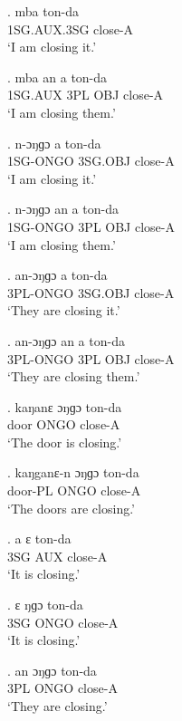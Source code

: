 \documentclass{assets/fieldnotes}
\begin{document}
\exg.
mba           ton-da  \\
1SG.AUX.3SG   close-A \\%
`I am closing it.'

\exg.
mba       an    a     ton-da  \\
1SG.AUX   3PL   OBJ   close-A \\%
`I am closing them.'

\exg.
n-ɔŋɡɔ     a         ton-da  \\
1SG-ONGO   3SG.OBJ   close-A \\%
`I am closing it.' \label{I am closing it}


\exg.
n-ɔŋɡɔ     an    a     ton-da  \\
1SG-ONGO   3PL   OBJ   close-A \\%
`I am closing them.' \label{I am closing them}

\exg.
an-ɔŋɡɔ    a         ton-da  \\
3PL-ONGO   3SG.OBJ   close-A \\%
`They are closing it.'

\exg.
an-ɔŋɡɔ    an    a     ton-da  \\
3PL-ONGO   3PL   OBJ   close-A \\%
`They are closing them.'

\exg.
kaŋanɛ   ɔŋɡɔ   ton-da  \\
door     ONGO   close-A \\%
`The door is closing.'

\exg.
kaŋganɛ-n   ɔŋɡɔ   ton-da  \\
door-PL     ONGO   close-A \\%
`The doors are closing.'

\exg.
a     ɛ     ton-da  \\
3SG   AUX   close-A \\%
`It is closing.'

\exg.
ɛ     ŋɡɔ    ton-da  \\
3SG   ONGO   close-A \\%
`It is closing.'

\exg.
an    ɔŋɡɔ   ton-da  \\
3PL   ONGO   close-A \\%
`They are closing.'
\end{document}
